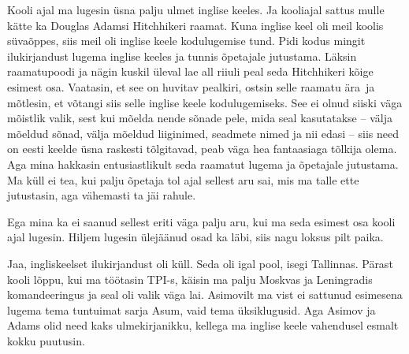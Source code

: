 Kooli ajal ma lugesin üsna palju ulmet inglise keeles. Ja kooliajal sattus 
mulle kätte ka Douglas Adamsi  Hitchhikeri raamat.
Kuna inglise keel oli meil koolis  süvaõppes, siis meil oli 
inglise keele kodulugemise tund. Pidi kodus mingit 
ilukirjandust lugema inglise keeles ja tunnis õpetajale jutustama. Läksin raamatupoodi 
ja nägin kuskil üleval lae all riiuli peal seda Hitchhikeri kõige esimest osa. 
Vaatasin, et see on huvitav pealkiri, ostsin selle raamatu ära ja mõtlesin, et 
võtangi siis selle inglise keele kodulugemiseks. See ei olnud siiski väga mõistlik 
valik, sest kui mõelda nende sõnade pele, mida seal kasutatakse -- välja mõeldud 
sõnad, välja mõeldud liiginimed, seadmete nimed ja nii edasi -- siis need on 
eesti keelde üsna raskesti tõlgitavad,  peab väga hea fantaasiaga tõlkija 
olema. Aga mina hakkasin entusiastlikult seda raamatut lugema ja  õpetajale jutustama. Ma 
küll ei tea, kui palju õpetaja tol ajal sellest aru sai, mis ma talle 
ette jutustasin, aga vähemasti ta jäi rahule. 


Ega mina ka ei saanud  sellest eriti väga palju aru, kui ma seda esimest osa 
kooli ajal lugesin. Hiljem lugesin  ülejäänud osad ka läbi, siis nagu loksus 
pilt paika.


Jaa, ingliskeelset ilukirjandust oli küll. Seda oli igal pool, isegi Tallinnas. 
Pärast kooli lõppu, kui ma töötasin TPI-s, 
käisin ma palju Moskvas ja Leningradis komandeeringus ja seal oli valik väga 
lai. Asimovilt ma vist ei sattunud esimesena lugema tema tuntuimat sarja Asum, vaid tema
üksiklugusid. Aga Asimov ja Adams olid need kaks ulmekirjanikku, 
kellega ma inglise keele vahendusel esmalt kokku puutusin. 



